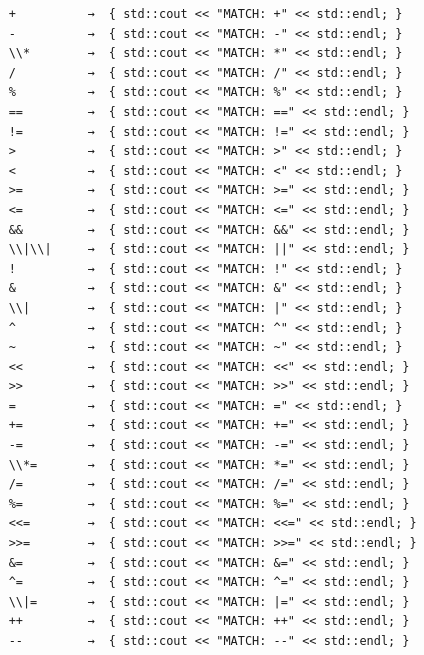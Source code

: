 \documentclass{article}
\begin{document}
\begin{lstlisting}
    +          →  { std::cout << "MATCH: +" << std::endl; }                  
    -          →  { std::cout << "MATCH: -" << std::endl; }                  
    \\*        →  { std::cout << "MATCH: *" << std::endl; }                  
    /          →  { std::cout << "MATCH: /" << std::endl; }                  
    %          →  { std::cout << "MATCH: %" << std::endl; }                  
    ==         →  { std::cout << "MATCH: ==" << std::endl; }                   
    !=         →  { std::cout << "MATCH: !=" << std::endl; }                   
    >          →  { std::cout << "MATCH: >" << std::endl; }                  
    <          →  { std::cout << "MATCH: <" << std::endl; }                  
    >=         →  { std::cout << "MATCH: >=" << std::endl; }                   
    <=         →  { std::cout << "MATCH: <=" << std::endl; }                   
    &&         →  { std::cout << "MATCH: &&" << std::endl; }                   
    \\|\\|     →  { std::cout << "MATCH: ||" << std::endl; }                   
    !          →  { std::cout << "MATCH: !" << std::endl; }                  
    &          →  { std::cout << "MATCH: &" << std::endl; }                  
    \\|        →  { std::cout << "MATCH: |" << std::endl; }                  
    ^          →  { std::cout << "MATCH: ^" << std::endl; }                  
    ~          →  { std::cout << "MATCH: ~" << std::endl; }                  
    <<         →  { std::cout << "MATCH: <<" << std::endl; }                   
    >>         →  { std::cout << "MATCH: >>" << std::endl; }                   
    =          →  { std::cout << "MATCH: =" << std::endl; }                  
    +=         →  { std::cout << "MATCH: +=" << std::endl; }                   
    -=         →  { std::cout << "MATCH: -=" << std::endl; }                   
    \\*=       →  { std::cout << "MATCH: *=" << std::endl; }                   
    /=         →  { std::cout << "MATCH: /=" << std::endl; }                   
    %=         →  { std::cout << "MATCH: %=" << std::endl; }                   
    <<=        →  { std::cout << "MATCH: <<=" << std::endl; }                    
    >>=        →  { std::cout << "MATCH: >>=" << std::endl; }                    
    &=         →  { std::cout << "MATCH: &=" << std::endl; }                   
    ^=         →  { std::cout << "MATCH: ^=" << std::endl; }                   
    \\|=       →  { std::cout << "MATCH: |=" << std::endl; }                   
    ++         →  { std::cout << "MATCH: ++" << std::endl; }                   
    --         →  { std::cout << "MATCH: --" << std::endl; }                   
    

\end{lstlisting}
\end{document}
